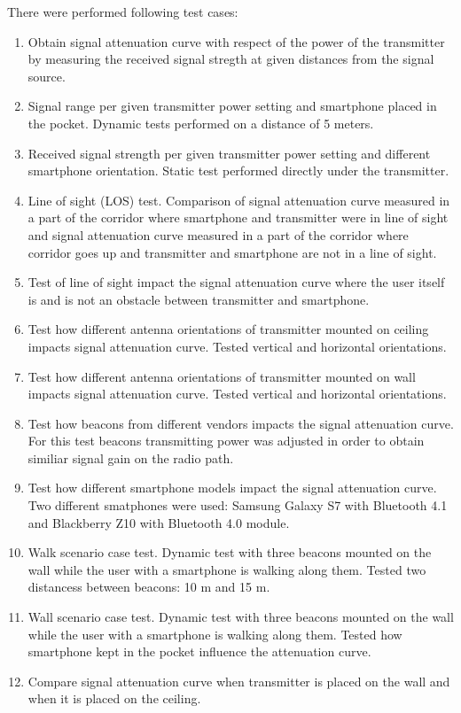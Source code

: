 \documentclass[../main.tex]{subfiles}
\begin{document}
There were performed following test cases:
\begin{enumerate}
	\item Obtain signal attenuation curve with respect of the power of the transmitter by measuring the received signal stregth at given distances from the signal source.
	\item Signal range per given transmitter power setting and smartphone placed in the pocket. Dynamic tests performed on a distance of 5 meters.
	\item Received signal strength per given transmitter power setting and different smartphone orientation. Static test performed directly under the transmitter.
	\item Line of sight (LOS) test. Comparison of signal attenuation curve measured in a part of the corridor where smartphone and transmitter were in line of sight and signal attenuation curve measured in a part of the corridor where corridor goes up and transmitter and smartphone are not in a line of sight.
	\item Test of line of sight impact the signal attenuation curve where the user itself is and is not an obstacle between transmitter and smartphone.
	\item Test how different antenna orientations of transmitter mounted on ceiling impacts signal attenuation curve. Tested vertical and horizontal orientations.
	\item Test how different antenna orientations of transmitter mounted on wall impacts signal attenuation curve. Tested vertical and horizontal orientations.
	\item Test how beacons from different vendors impacts the signal attenuation curve. For this test beacons transmitting power was adjusted in order to obtain similiar signal gain on the radio path.
	\item Test how different smartphone models impact the signal attenuation curve. Two different smatphones were used: Samsung Galaxy S7 with Bluetooth 4.1 and Blackberry Z10 with Bluetooth 4.0 module.
	\item Walk scenario case test. Dynamic test with three beacons mounted on the wall while the user with a smartphone is walking along them. Tested two distancess between beacons: 10 m and 15 m.
	\item Wall scenario case test. Dynamic test with three beacons mounted on the wall while the user with a smartphone is walking along them. Tested how smartphone kept in the pocket influence the attenuation curve.
	\item  Compare signal attenuation curve when transmitter is placed on the wall and when it is placed on the ceiling.
\end{enumerate}
\end{document}

